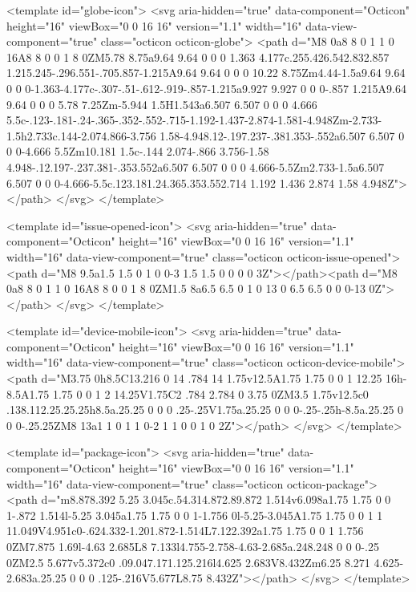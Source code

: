 <template id="globe-icon">
  <svg aria-hidden="true" data-component="Octicon" height="16" viewBox="0 0 16 16" version="1.1" width="16" data-view-component="true" class="octicon octicon-globe">
    <path d="M8 0a8 8 0 1 1 0 16A8 8 0 0 1 8 0ZM5.78 8.75a9.64 9.64 0 0 0 1.363 4.177c.255.426.542.832.857 1.215.245-.296.551-.705.857-1.215A9.64 9.64 0 0 0 10.22 8.75Zm4.44-1.5a9.64 9.64 0 0 0-1.363-4.177c-.307-.51-.612-.919-.857-1.215a9.927 9.927 0 0 0-.857 1.215A9.64 9.64 0 0 0 5.78 7.25Zm-5.944 1.5H1.543a6.507 6.507 0 0 0 4.666 5.5c-.123-.181-.24-.365-.352-.552-.715-1.192-1.437-2.874-1.581-4.948Zm-2.733-1.5h2.733c.144-2.074.866-3.756 1.58-4.948.12-.197.237-.381.353-.552a6.507 6.507 0 0 0-4.666 5.5Zm10.181 1.5c-.144 2.074-.866 3.756-1.58 4.948-.12.197-.237.381-.353.552a6.507 6.507 0 0 0 4.666-5.5Zm2.733-1.5a6.507 6.507 0 0 0-4.666-5.5c.123.181.24.365.353.552.714 1.192 1.436 2.874 1.58 4.948Z"></path>
</svg>
</template>

<template id="issue-opened-icon">
  <svg aria-hidden="true" data-component="Octicon" height="16" viewBox="0 0 16 16" version="1.1" width="16" data-view-component="true" class="octicon octicon-issue-opened">
    <path d="M8 9.5a1.5 1.5 0 1 0 0-3 1.5 1.5 0 0 0 0 3Z"></path><path d="M8 0a8 8 0 1 1 0 16A8 8 0 0 1 8 0ZM1.5 8a6.5 6.5 0 1 0 13 0 6.5 6.5 0 0 0-13 0Z"></path>
</svg>
</template>

<template id="device-mobile-icon">
  <svg aria-hidden="true" data-component="Octicon" height="16" viewBox="0 0 16 16" version="1.1" width="16" data-view-component="true" class="octicon octicon-device-mobile">
    <path d="M3.75 0h8.5C13.216 0 14 .784 14 1.75v12.5A1.75 1.75 0 0 1 12.25 16h-8.5A1.75 1.75 0 0 1 2 14.25V1.75C2 .784 2.784 0 3.75 0ZM3.5 1.75v12.5c0 .138.112.25.25.25h8.5a.25.25 0 0 0 .25-.25V1.75a.25.25 0 0 0-.25-.25h-8.5a.25.25 0 0 0-.25.25ZM8 13a1 1 0 1 1 0-2 1 1 0 0 1 0 2Z"></path>
</svg>
</template>

<template id="package-icon">
  <svg aria-hidden="true" data-component="Octicon" height="16" viewBox="0 0 16 16" version="1.1" width="16" data-view-component="true" class="octicon octicon-package">
    <path d="m8.878.392 5.25 3.045c.54.314.872.89.872 1.514v6.098a1.75 1.75 0 0 1-.872 1.514l-5.25 3.045a1.75 1.75 0 0 1-1.756 0l-5.25-3.045A1.75 1.75 0 0 1 1 11.049V4.951c0-.624.332-1.201.872-1.514L7.122.392a1.75 1.75 0 0 1 1.756 0ZM7.875 1.69l-4.63 2.685L8 7.133l4.755-2.758-4.63-2.685a.248.248 0 0 0-.25 0ZM2.5 5.677v5.372c0 .09.047.171.125.216l4.625 2.683V8.432Zm6.25 8.271 4.625-2.683a.25.25 0 0 0 .125-.216V5.677L8.75 8.432Z"></path>
</svg>
</template>

